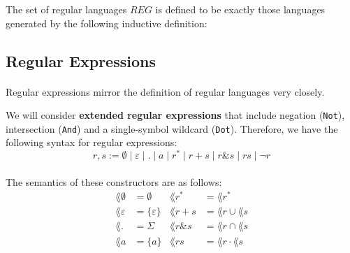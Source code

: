     \begin{definition}{}
        \label{REG}
        The set of regular languages $REG$ is defined to be exactly those languages generated by the following inductive definition:
        
    \end{definition}


    \subsection{Regular Expressions}

    \paragraph{} 
    Regular expressions mirror the definition of regular languages very closely. 
    \begin{definition}
        \label{extregex}
    We will consider \textbf{extended regular expressions} that include negation (\lstinline{Not}), intersection (\lstinline{And}) and a single-symbol wildcard (\lstinline{Dot}). 
    Therefore, we have the following syntax for regular expressions:
    \begin{equation*}
        r,s := \emptyset \; | \; \varepsilon \; | \; . \; | \; a \; | \; r^* \; | \; r + s \; | \; r \& s \; | \; r s \; | \; \neg r
    \end{equation*}
        

    \paragraph{} 
    The semantics of these constructors are as follows:
    \begin{align*}
        \lang{\emptyset} & = \emptyset
        & 
        \lang{r^*} & = \lang{r}^* \\
        \lang{\varepsilon} & = \{\varepsilon\}
        & 
        \lang{r + s} & = \lang{r} \cup \lang{s} \\
        \lang{.} & = \Sigma
        & 
        \lang{r \& s} & = \lang{r} \cap \lang{s} \\
        \lang{a} & = \{a\}
        &
        \lang{r s} & = \lang{r} \cdot \lang{s}
    \end{align*}
    \end{definition}


